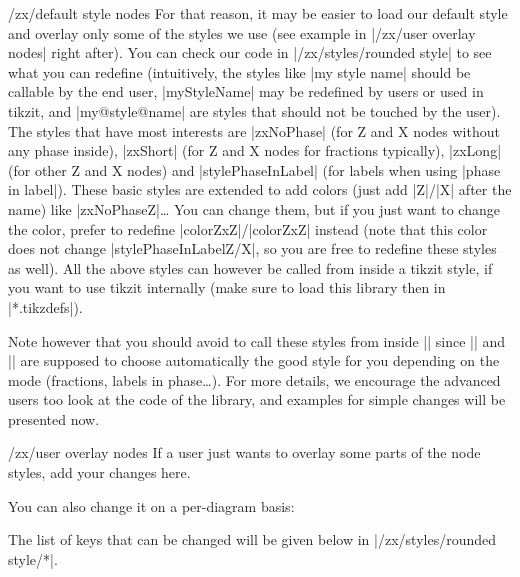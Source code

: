 \documentclass[a4paper]{ltxdoc}
\begin{document}
{\begin{stylekey}{/zx/default style nodes}
  For that reason, it may be easier to load our default style and overlay only some of the styles we use (see example in |/zx/user overlay nodes| right after). You can check our code in |/zx/styles/rounded style| to see what you can redefine (intuitively, the styles like |my style name| should be callable by the end user, |myStyleName| may be redefined by users or used in tikzit, and |my@style@name| are styles that should not be touched by the user). The styles that have most interests are |zxNoPhase| (for Z and X nodes without any phase inside), |zxShort| (for Z and X nodes for fractions typically), |zxLong| (for other Z and X nodes) and |stylePhaseInLabel| (for labels when using |phase in label|). These basic styles are extended to add colors (just add |Z|/|X| after the name) like |zxNoPhaseZ|\dots{} You can change them, but if you just want to change the color, prefer to redefine |colorZxZ|/|colorZxZ| instead (note that this color does not change |stylePhaseInLabelZ/X|, so you are free to redefine these styles as well). All the above styles can however be called from inside a tikzit style, if you want to use tikzit internally (make sure to load this library then in |*.tikzdefs|).

  Note however that you should avoid to call these styles from inside || since |\zx*| and |\zxFrac*| are supposed to choose automatically the good style for you depending on the mode (fractions, labels in phase\dots{}). For more details, we encourage the advanced users too look at the code of the library, and examples for simple changes will be presented now.
\end{stylekey}

\begin{stylekey}{/zx/user overlay nodes}
  If a user just wants to overlay some parts of the node styles, add your changes here.
\begin{codeexample}[]
  {
    \zx{\zxNone{} \rar & \zxH{} \rar & \zxNone{}}
  }
\end{codeexample}
You can also change it on a per-diagram basis:
\begin{codeexample}[]
\end{codeexample}
The list of keys that can be changed will be given below in |/zx/styles/rounded style/*|.
\end{stylekey}

}
\end{document}
